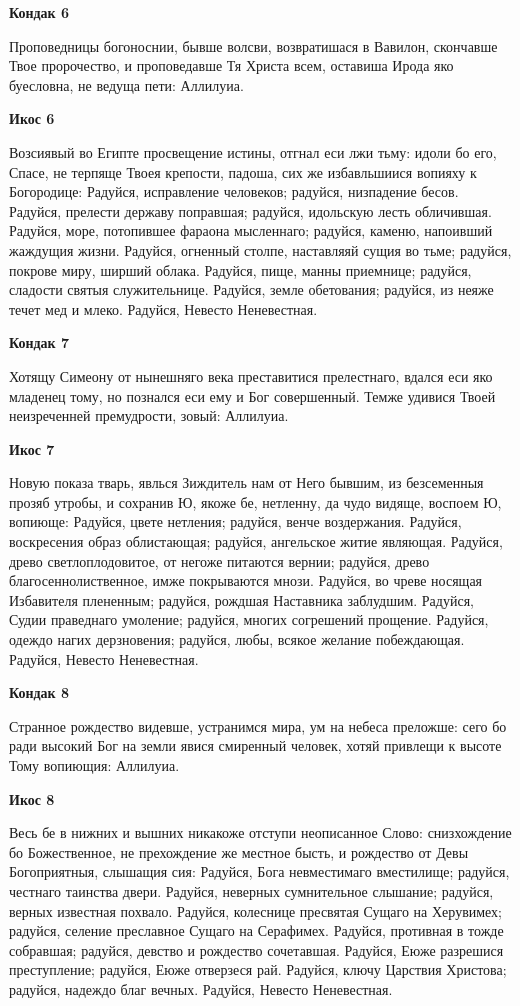 \bfseries Кондак 6\normalfont{}


Проповедницы богоноснии, бывше волсви, возвратишася в Вавилон, скончавше Твое пророчество, и проповедавше Тя Христа всем, оставиша Ирода яко буесловна, не ведуща пети: Аллилуиа.


\bfseries Икос 6\normalfont{}


Возсиявый во Египте просвещение истины, отгнал еси лжи тьму: идоли бо его, Спасе, не терпяще Твоея крепости, падоша, сих же избавльшиися вопияху к Богородице: Радуйся, исправление человеков; радуйся, низпадение бесов. Радуйся, прелести державу поправшая; радуйся, идольскую лесть обличившая. Радуйся, море, потопившее фараона мысленнаго; радуйся, каменю, напоивший жаждущия жизни. Радуйся, огненный столпе, наставляяй сущия во тьме; радуйся, покрове миру, ширший облака. Радуйся, пище, манны приемнице; радуйся, сладости святыя служительнице. Радуйся, земле обетования; радуйся, из неяже течет мед и млеко. Радуйся, Невесто Неневестная.


\bfseries Кондак 7\normalfont{}


Хотящу Симеону от нынешняго века преставитися прелестнаго, вдался еси яко младенец тому, но познался еси ему и Бог совершенный. Темже удивися Твоей неизреченней премудрости, зовый: Аллилуиа.


\bfseries Икос 7\normalfont{}


Новую показа тварь, явлься Зиждитель нам от Него бывшим, из безсеменныя прозяб утробы, и сохранив Ю, якоже бе, нетленну, да чудо видяще, воспоем Ю, вопиюще: Радуйся, цвете нетления; радуйся, венче воздержания. Радуйся, воскресения образ облистающая; радуйся, ангельское житие являющая. Радуйся, древо светлоплодовитое, от негоже питаются вернии; радуйся, древо благосеннолиственное, имже покрываются мнози. Радуйся, во чреве носящая Избавителя плененным; радуйся, рождшая Наставника заблудшим. Радуйся, Судии праведнаго умоление; радуйся, многих согрешений прощение. Радуйся, одеждо нагих дерзновения; радуйся, любы, всякое желание побеждающая. Радуйся, Невесто Неневестная.


\bfseries Кондак 8\normalfont{}


Странное рождество видевше, устранимся мира, ум на небеса преложше: сего бо ради высокий Бог на земли явися смиренный человек, хотяй привлещи к высоте Тому вопиющия: Аллилуиа.


\bfseries Икос 8\normalfont{}


Весь бе в нижних и вышних никакоже отступи неописанное Слово: снизхождение бо Божественное, не прехождение же местное бысть, и рождество от Девы Богоприятныя, слышащия сия: Радуйся, Бога невместимаго вместилище; радуйся, честнаго таинства двери. Радуйся, неверных сумнительное слышание; радуйся, верных известная похвало. Радуйся, колеснице пресвятая Сущаго на Херувимех; радуйся, селение преславное Сущаго на Серафимех. Радуйся, противная в тожде собравшая; радуйся, девство и рождество сочетавшая. Радуйся, Еюже разрешися преступление; радуйся, Еюже отверзеся рай. Радуйся, ключу Царствия Христова; радуйся, надеждо благ вечных. Радуйся, Невесто Неневестная.


